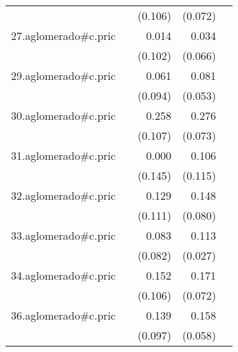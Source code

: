 {\begin{longtable}{l*{4}{D{.}{.}{-1}}}
            &                     &     (0.106)         &     (0.072)         &                     \\
\addlinespace
27.aglomerado#c.pric&                     &       0.014         &       0.034         &                     \\
            &                     &     (0.102)         &     (0.066)         &                     \\
\addlinespace
29.aglomerado#c.pric&                     &       0.061         &       0.081         &                     \\
            &                     &     (0.094)         &     (0.053)         &                     \\
\addlinespace
30.aglomerado#c.pric&                     &       0.258\sym{*}  &       0.276\sym{***}&                     \\
            &                     &     (0.107)         &     (0.073)         &                     \\
\addlinespace
31.aglomerado#c.pric&                     &       0.000         &       0.106         &                     \\
            &                     &     (0.145)         &     (0.115)         &                     \\
\addlinespace
32.aglomerado#c.pric&                     &       0.129         &       0.148         &                     \\
            &                     &     (0.111)         &     (0.080)         &                     \\
\addlinespace
33.aglomerado#c.pric&                     &       0.083         &       0.113\sym{***}&                     \\
            &                     &     (0.082)         &     (0.027)         &                     \\
\addlinespace
34.aglomerado#c.pric&                     &       0.152         &       0.171\sym{*}  &                     \\
            &                     &     (0.106)         &     (0.072)         &                     \\
\addlinespace
36.aglomerado#c.pric&                     &       0.139         &       0.158\sym{**} &                     \\
            &                     &     (0.097)         &     (0.058)         &                     \\

\end{longtable}}
